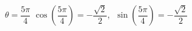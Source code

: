 {$\theta = \dfrac{5\pi}{4}$}
{$\cos \left(\dfrac{5\pi}{4} \right) = -\dfrac{\sqrt{2}}{2}$, $\; \sin \left(\dfrac{5\pi}{4} \right) = -\dfrac{\sqrt{2}}{2}$}
